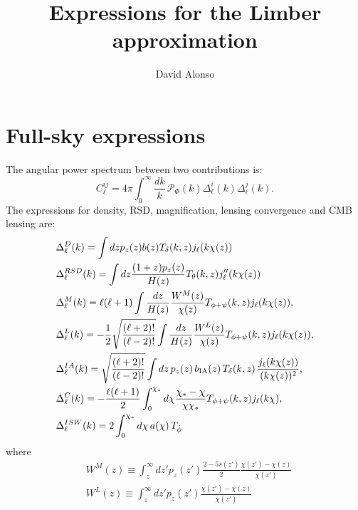 \documentclass[a4paper,10pt]{article}
\title{Expressions for the Limber approximation}
\author{David Alonso}
\begin{document}
\maketitle

\section{Full-sky expressions}
The angular power spectrum between two contributions is:
\begin{equation}
 C^{ij}_\ell=4\pi\int_0^\infty \frac{dk}{k}\,\mathcal{P}_\Phi(k)\Delta^i_\ell(k)\Delta^j_\ell(k).
\end{equation}
The expressions for density, RSD, magnification, lensing convergence and CMB lensing are:
\begin{align}
  &\Delta_\ell^D(k)=\int dz p_z(z) b(z) T_\delta(k,z) j_\ell(k\chi(z))\\
  &\Delta_\ell^{RSD}(k)=\int dz \frac{(1+z) p_z(z)}{H(z)}T_\theta(k,z) j_\ell''(k\chi(z))\\
  &\Delta_\ell^M(k)=\ell(\ell+1)\int \frac{dz}{H(z)}\frac{W^M(z)}{\chi(z)} T_{\phi+\psi}(k,z) j_\ell(k\chi(z)), \\ 
  &\Delta_\ell^L(k)=-\frac{1}{2}\sqrt{\frac{(\ell+2)!}{(\ell-2)!}}\int \frac{dz}{H(z)} \frac{W^L(z)}{\chi(z)} T_{\phi+\psi}(k,z) j_\ell(k\chi(z)),  \\
  &\Delta_\ell^{IA}(k)=\sqrt{\frac{(\ell+2)!}{(\ell-2)!}}\int dz\,p_z(z)\,b_{\rm IA}(z)\,T_\delta(k,z)\,\frac{j_\ell(k\chi(z))}{(k\chi(z))^2},  \\
  &\Delta_\ell^C(k)=-\frac{\ell(\ell+1)}{2}\int_0^{\chi_*}d\chi
  \frac{\chi_*-\chi}{\chi\chi_*} T_{\phi+\psi}(k,z) j_\ell(k\chi),\\
  &\Delta_\ell^{ISW}(k)=2\int_0^{\chi_*}d\chi\,a(\chi)\,T_{\dot{\phi}}
\end{align}
where
\begin{align}
 &W^M(z)\equiv\int_z^\infty dz' p_z(z')\frac{2-5s(z')}{2}\frac{\chi(z')-\chi(z)}{\chi(z')}\\
 &W^L(z)\equiv\int_z^\infty dz' p_z(z')\frac{\chi(z')-\chi(z)}{\chi(z')}
\end{align}
\end{document}
